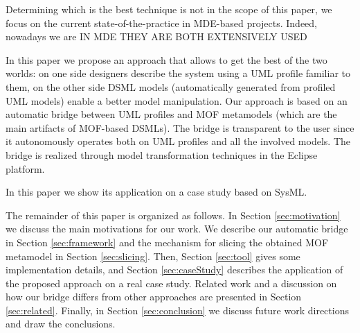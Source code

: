 Determining which is the best technique is not in the scope of this paper, we focus on the current state-of-the-practice
in MDE-based projects. Indeed, nowadays we are      IN MDE THEY ARE BOTH EXTENSIVELY USED  




In this paper we propose an approach that allows to get the best of the two worlds: 
on one side designers describe the system using a UML profile familiar to them, on the other side DSML models (automatically generated from profiled UML models) enable a better model manipulation. Our approach is based on an automatic bridge between UML profiles and MOF metamodels (which are the main artifacts of MOF-based DSMLs). The bridge is transparent to the user since it autonomously operates both on UML profiles 
and all the involved models. The bridge is realized through model transformation techniques in the Eclipse platform.



 In this paper we show its application on a case study based on SysML.


The remainder of this paper is organized as follows. In Section \ref{sec:motivation} we discuss the main motivations for our work.
We describe our automatic bridge in Section \ref{sec:framework} and the mechanism for slicing the obtained MOF metamodel 
in Section \ref{sec:slicing}. 
Then, Section \ref{sec:tool} gives some implementation details, and Section \ref{sec:caseStudy} describes the application of
the proposed approach on a real case study. Related work and a discussion on how our bridge differs from other approaches
are presented in Section \ref{sec:related}. 
Finally, in Section \ref{sec:conclusion} we discuss future work directions and draw the conclusions. 

















